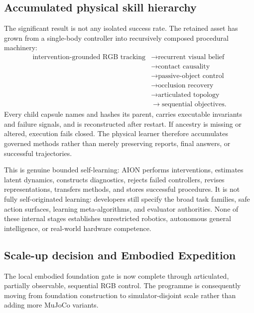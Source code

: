 \subsection{Accumulated physical skill hierarchy}

The significant result is not any isolated success rate.  The retained asset
has grown from a single-body controller into recursively composed procedural
machinery:
\begin{equation}
\label{eq:accumulated-physical-skill-chain}
\begin{aligned}
\text{intervention-grounded RGB tracking}
&\rightarrow \text{recurrent visual belief}\nonumber\\
&\rightarrow \text{contact causality}\nonumber\\
&\rightarrow \text{passive-object control}\nonumber\\
&\rightarrow \text{occlusion recovery}\nonumber\\
&\rightarrow \text{articulated topology}\nonumber\\
&\rightarrow \text{sequential objectives}.
\end{aligned}
\end{equation}
Every child capsule names and hashes its parent, carries executable invariants
and failure signals, and is reconstructed after restart.  If ancestry is
missing or altered, execution fails closed.  The physical learner therefore
accumulates governed methods rather than merely preserving reports, final
answers, or successful trajectories.

This is genuine bounded self-learning: AION performs interventions, estimates
latent dynamics, constructs diagnostics, rejects failed controllers, revises
representations, transfers methods, and stores successful procedures.  It is
not fully self-originated learning: developers still specify the broad task
families, safe action surfaces, learning meta-algorithms, and evaluator
authorities.  None of these internal stages establishes unrestricted robotics,
autonomous general intelligence, or real-world hardware competence.

\subsection{Scale-up decision and Embodied Expedition}

The local embodied foundation gate is now complete through articulated,
partially observable, sequential RGB control.  The programme is consequently
moving from foundation construction to simulator-disjoint scale rather than
adding more MuJoCo variants.


